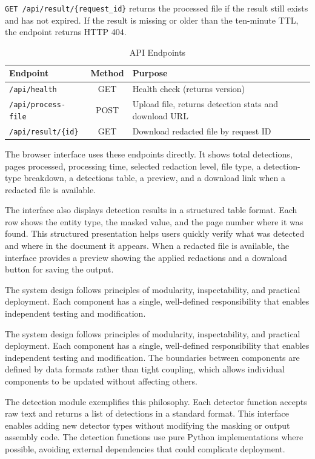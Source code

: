 \texttt{GET /api/result/\{request\_id\}} returns the processed file if the result still exists and has not expired. If the result is missing or older than the ten-minute TTL, the endpoint returns HTTP 404.

\begin{table}[htbp]
\caption{API Endpoints}
\label{tab:api_endpoints}
\centering
\begin{tabular}{|l|c|l|}
\hline
\textbf{Endpoint} & \textbf{Method} & \textbf{Purpose} \\
\hline
\texttt{/api/health} & GET & Health check (returns version) \\
\hline
\texttt{/api/process-file} & POST & Upload file, returns detection stats and download URL \\
\hline
\texttt{/api/result/\{id\}} & GET & Download redacted file by request ID \\
\hline
\end{tabular}
\end{table}

The browser interface uses these endpoints directly. It shows total detections, pages processed, processing time, selected redaction level, file type, a detection-type breakdown, a detections table, a preview, and a download link when a redacted file is available.

The interface also displays detection results in a structured table format. Each row shows the entity type, the masked value, and the page number where it was found. This structured presentation helps users quickly verify what was detected and where in the document it appears. When a redacted file is available, the interface provides a preview showing the applied redactions and a download button for saving the output.

\bigskip

The system design follows principles of modularity, inspectability, and practical deployment. Each component has a single, well-defined responsibility that enables independent testing and modification.

The system design follows principles of modularity, inspectability, and practical deployment. Each component has a single, well-defined responsibility that enables independent testing and modification. The boundaries between components are defined by data formats rather than tight coupling, which allows individual components to be updated without affecting others.

The detection module exemplifies this philosophy. Each detector function accepts raw text and returns a list of detections in a standard format. This interface enables adding new detector types without modifying the masking or output assembly code. The detection functions use pure Python implementations where possible, avoiding external dependencies that could complicate deployment.

